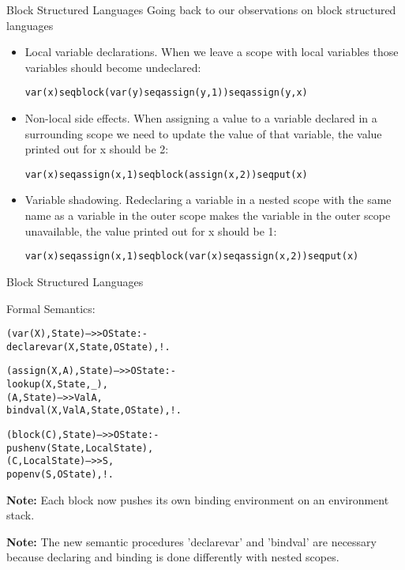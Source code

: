 \documentclass{beamer}
\begin{document}
\begin{frame}{Block Structured Languages}
Going back to our observations on block structured languages
\begin{itemize}
\item
Local variable declarations.  When we leave a scope with local variables those 
variables should become undeclared:
\begin{alltt}
\scriptsize
  var(x) seq block( var(y) seq assign(y,1) ) seq assign(y,x)
\end{alltt}
\item
Non-local side effects. When assigning a value to a variable declared in a surrounding scope
we need to update the value of that variable, the value printed out for x should be 2:  
\begin{alltt}
\scriptsize
  var(x) seq assign(x,1) seq block( assign(x,2) ) seq put(x)
\end{alltt}

\item
Variable shadowing.  Redeclaring a variable in a nested scope with the same name as
a variable in the outer scope makes the variable in the outer scope unavailable,
the value printed out for x should be 1:
\begin{alltt}
\scriptsize
  var(x) seq assign(x,1) seq block( var(x) seq assign(x,2) ) seq put(x)
\end{alltt}
\end{itemize}

\end{frame}

\begin{frame}[fragile]{Block Structured Languages}

\small
Formal Semantics:
\begin{alltt}\scriptsize
(var(X),State) -->> OState :-          % decl,
    {\color{red}declarevar}(X,State,OState),!.

(assign(X,A),State) -->> OState :-     % assignment
    lookup(X,State,_),                 % only allowed to assign to variables
    (A,State) -->> ValA,               % that have been declared
    {\color{red}bindval}(X,ValA,State,OState),!.

(block(C),State) -->> OState :-        %block%     block statement
    {\color{red}pushenv}(State,LocalState),
    (C,LocalState) -->> S,
    {\color{red}popenv}(S,OState),!.
\end{alltt}

\vspace{.1in}

{\bf Note:} Each block now pushes its own binding environment on an environment stack.

\vspace{.1in}

{\bf Note:} The new semantic procedures 'declarevar' and 'bindval' are necessary because
declaring and binding is done differently with nested scopes.
\end{frame}
\end{document}
